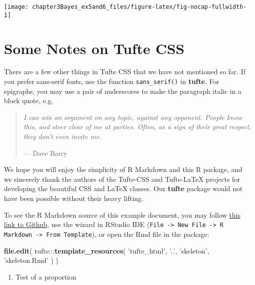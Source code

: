\documentclass[]{tufte-handout}
\newenvironment{Shaded}{}{}
\newcommand{\KeywordTok}[1]{\textcolor[rgb]{0.00,0.44,0.13}{\textbf{{#1}}}}
\newcommand{\StringTok}[1]{\textcolor[rgb]{0.25,0.44,0.63}{{#1}}}
\newcommand{\NormalTok}[1]{{#1}}
\begin{document}
\begin{figure*}
\texttt{[image: chapter3Bayes\_ex5and6\_files/figure-latex/fig-nocap-fullwidth-1]} \end{figure*}

\section{Some Notes on Tufte CSS}\label{some-notes-on-tufte-css}

There are a few other things in Tufte CSS that we have not mentioned so
far. If you prefer \textsf{sans-serif fonts}, use the function
\texttt{sans\_serif()} in \textbf{tufte}. For epigraphs, you may use a
pair of underscores to make the paragraph italic in a block quote, e.g.

\begin{quote}
\emph{I can win an argument on any topic, against any opponent. People
know this, and steer clear of me at parties. Often, as a sign of their
great respect, they don't even invite me.}

\hfill --- Dave Barry
\end{quote}

We hope you will enjoy the simplicity of R Markdown and this R package,
and we sincerely thank the authors of the Tufte-CSS and Tufte-LaTeX
projects for developing the beautiful CSS and LaTeX classes. Our
\textbf{tufte} package would not have been possible without their heavy
lifting.

To see the R Markdown source of this example document, you may follow
\href{https://github.com/rstudio/tufte/raw/master/inst/rmarkdown/templates/tufte_html/skeleton/skeleton.Rmd}{this
link to Github}, use the wizard in RStudio IDE
(\texttt{File -\textgreater{} New File -\textgreater{} R Markdown -\textgreater{} From Template}),
or open the Rmd file in the package:

\begin{Shaded}
\begin{Highlighting}[]
\KeywordTok{file.edit}\NormalTok{(}
  \NormalTok{tufte:::}\KeywordTok{template_resources}\NormalTok{(}
    \StringTok{'tufte_html'}\NormalTok{, }\StringTok{'..'}\NormalTok{, }\StringTok{'skeleton'}\NormalTok{, }\StringTok{'skeleton.Rmd'}
  \NormalTok{)}
\NormalTok{)}
\end{Highlighting}
\end{Shaded}

\begin{enumerate}
\def\labelenumi{\arabic{enumi}.}
\setcounter{enumi}{4}
\itemsep1pt\parskip0pt
\item
  Test of a proportion
\end{enumerate}
\end{document}
